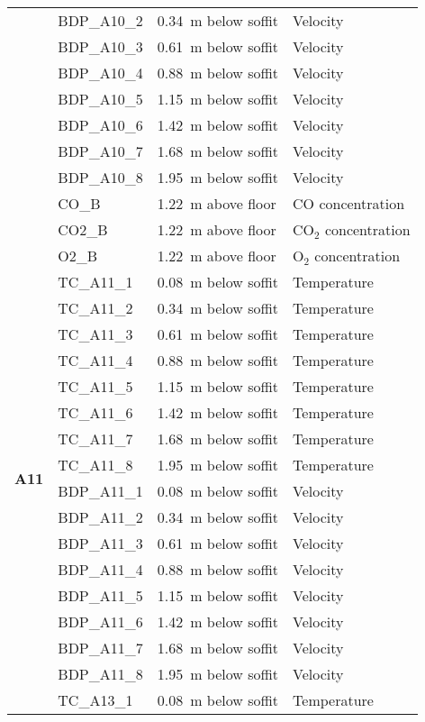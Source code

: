\begin{longtable}[c]{c|lll}
 & BDP\_A10\_2 & 0.34~m below soffit  & Velocity \\
 & BDP\_A10\_3 & 0.61~m below soffit  & Velocity \\
 & BDP\_A10\_4 & 0.88~m below soffit  & Velocity \\
 & BDP\_A10\_5 & 1.15~m below soffit  & Velocity \\
 & BDP\_A10\_6 & 1.42~m below soffit  & Velocity \\
 & BDP\_A10\_7 & 1.68~m below soffit  & Velocity \\
 & BDP\_A10\_8 & 1.95~m below soffit  & Velocity \\
\cline{2-4}
 & CO\_B      & 1.22~m above floor   & CO concentration \\
 & CO2\_B     & 1.22~m above floor   & CO$_2$ concentration \\
 & O2\_B      & 1.22~m above floor   & O$_2$ concentration \\
\midrule
\multirow{16}{*}{\large{\textbf{A11}}}
 & TC\_A11\_1  & 0.08~m below soffit  & Temperature \\
 & TC\_A11\_2  & 0.34~m below soffit  & Temperature \\
 & TC\_A11\_3  & 0.61~m below soffit  & Temperature \\
 & TC\_A11\_4  & 0.88~m below soffit  & Temperature \\
 & TC\_A11\_5  & 1.15~m below soffit  & Temperature \\
 & TC\_A11\_6  & 1.42~m below soffit  & Temperature \\
 & TC\_A11\_7  & 1.68~m below soffit  & Temperature \\
 & TC\_A11\_8  & 1.95~m below soffit  & Temperature \\
\cline{2-4}
 & BDP\_A11\_1 & 0.08~m below soffit  & Velocity \\
 & BDP\_A11\_2 & 0.34~m below soffit  & Velocity \\
 & BDP\_A11\_3 & 0.61~m below soffit  & Velocity \\
 & BDP\_A11\_4 & 0.88~m below soffit  & Velocity \\
 & BDP\_A11\_5 & 1.15~m below soffit  & Velocity \\
 & BDP\_A11\_6 & 1.42~m below soffit  & Velocity \\
 & BDP\_A11\_7 & 1.68~m below soffit  & Velocity \\
 & BDP\_A11\_8 & 1.95~m below soffit  & Velocity \\
\bottomrule
\newpage
\multirow{16}{*}{\large{\textbf{A13}}}
 & TC\_A13\_1  & 0.08~m below soffit  & Temperature \\

\end{longtable}
